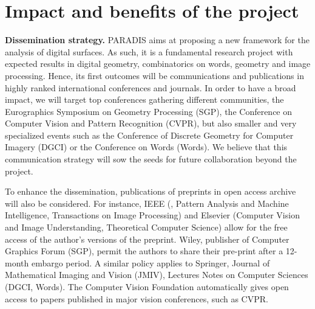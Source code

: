 \section{Impact and benefits of the project}
\label{sec:impact}



\noindent\textbf{Dissemination strategy.}
PARADIS aims at proposing a new framework for the analysis of digital surfaces.
As such, it is a fundamental research project with expected results in digital
geometry, combinatorics on words, geometry and image processing. Hence,
its first outcomes will be communications and publications in highly ranked
international conferences and journals. In order to have a broad impact, we
will target top conferences gathering different communities, \eg
the Eurographics Symposium on Geometry Processing (SGP),
the Conference on Computer Vision and Pattern Recognition (CVPR),
but also smaller and very specialized events such as the Conference
of Discrete Geometry for Computer Imagery (DGCI) or the Conference on Words (Words). 
We believe that this communication strategy will sow the seeds for future collaboration
beyond the project.

To enhance the dissemination, publications of preprints in open access archive
will also be considered. For instance, IEEE (\eg, Pattern Analysis and Machine Intelligence,
Transactions on Image Processing) and Elsevier (\eg Computer Vision and Image Understanding,
Theoretical Computer Science) allow for the free access of the author's versions of the preprint.
Wiley, publisher of Computer Graphics Forum (SGP), permit the authors to share their pre-print after
a 12-month embargo period. A similar policy applies to Springer, \eg Journal of Mathematical
Imaging and Vision (JMIV), Lectures Notes on Computer Sciences (DGCI, Words). The Computer Vision
Foundation automatically gives open access to papers published in major vision conferences, such as CVPR. 

